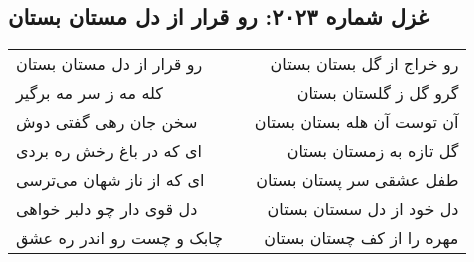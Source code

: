 \begin{center}
\section*{غزل شماره ۲۰۲۳: رو قرار از دل مستان بستان}
\label{sec:2023}
\begin{longtable}{l p{0.5cm} r}
رو قرار از دل مستان بستان
&&
رو خراج از گل بستان بستان
\\
کله مه ز سر مه برگیر
&&
گرو گل ز گلستان بستان
\\
سخن جان رهی گفتی دوش
&&
آن توست آن هله بستان بستان
\\
ای که در باغ رخش ره بردی
&&
گل تازه به زمستان بستان
\\
ای که از ناز شهان می‌ترسی
&&
طفل عشقی سر پستان بستان
\\
دل قوی دار چو دلبر خواهی
&&
دل خود از دل سستان بستان
\\
چابک و چست رو اندر ره عشق
&&
مهره را از کف چستان بستان
\\
\end{longtable}
\end{center}
